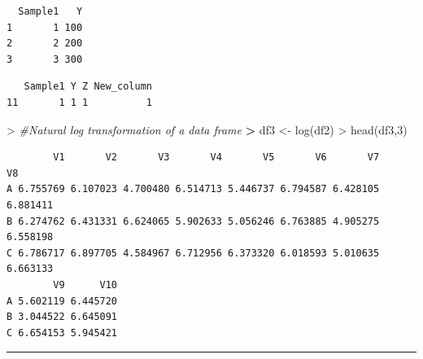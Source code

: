 \documentclass[
]{book}
\newenvironment{Shaded}{\begin{snugshade}}{\end{snugshade}}
\newcommand{\CommentTok}[1]{\textcolor[rgb]{0.56,0.35,0.01}{\textit{#1}}}
\newcommand{\DecValTok}[1]{\textcolor[rgb]{0.00,0.00,0.81}{#1}}
\newcommand{\ErrorTok}[1]{\textcolor[rgb]{0.64,0.00,0.00}{\textbf{#1}}}
\newcommand{\FunctionTok}[1]{\textcolor[rgb]{0.00,0.00,0.00}{#1}}
\newcommand{\NormalTok}[1]{#1}
\newcommand{\OtherTok}[1]{\textcolor[rgb]{0.56,0.35,0.01}{#1}}
\newcommand{\SpecialCharTok}[1]{\textcolor[rgb]{0.00,0.00,0.00}{#1}}
\theoremstyle{definition}
\theoremstyle{definition}
\theoremstyle{definition}
\theoremstyle{definition}
\theoremstyle{remark}
\begin{document}
\begin{verbatim}
  Sample1   Y
1       1 100
2       2 200
3       3 300
\end{verbatim}

\begin{Shaded}
\end{Shaded}

\begin{verbatim}
   Sample1 Y Z New_column
11       1 1 1          1
\end{verbatim}

\begin{Shaded}
\begin{Highlighting}[]
\SpecialCharTok{\textgreater{}} \CommentTok{\#Natural log transformation of a data frame}
\ErrorTok{\textgreater{}}\NormalTok{ df3 }\OtherTok{\textless{}{-}} \FunctionTok{log}\NormalTok{(df2)}
\SpecialCharTok{\textgreater{}} \FunctionTok{head}\NormalTok{(df3,}\DecValTok{3}\NormalTok{)}
\end{Highlighting}
\end{Shaded}

\begin{verbatim}
        V1       V2       V3       V4       V5       V6       V7       V8
A 6.755769 6.107023 4.700480 6.514713 5.446737 6.794587 6.428105 6.881411
B 6.274762 6.431331 6.624065 5.902633 5.056246 6.763885 4.905275 6.558198
C 6.786717 6.897705 4.584967 6.712956 6.373320 6.018593 5.010635 6.663133
        V9      V10
A 5.602119 6.445720
B 3.044522 6.645091
C 6.654153 5.945421
\end{verbatim}

\begin{center}\rule{0.5\linewidth}{0.5pt}\end{center}
\end{document}
